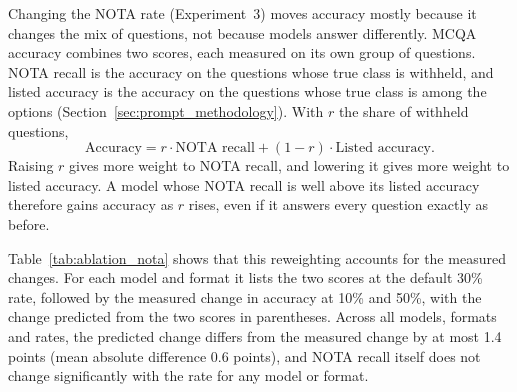 \documentclass[10pt,letterpaper]{article}
\newcommand{\tablefont}{\footnotesize}
\begin{document}
\begin{table}[!tp]
\centering
\caption{NOTA rate (Experiment 3; seed 0, seven models). MCQA accuracy combines NOTA recall, the accuracy on items whose true class is withheld, with listed accuracy, the accuracy on items whose true class is among the options (Section~\ref{sec:prompt_methodology}); both are measured at the default 30\% rate (\%). $\Delta$ at 10\% and $\Delta$ at 50\% give the measured change in accuracy (points) when 10\% or 50\% of items have their true class withheld, relative to the same model at 30\%. In parentheses is the change predicted, dataset by dataset, from NOTA recall and listed accuracy alone, i.e., if the model answered every item as before. $^{*}$95\% paired bootstrap CI over datasets excludes 0.}
\label{tab:ablation_nota}
\renewcommand{\arraystretch}{1.2}
\tablefont

\end{table}

Changing the NOTA rate (Experiment~3) moves accuracy mostly because it changes the mix of questions, not because models answer differently. MCQA accuracy combines two scores, each measured on its own group of questions. NOTA recall is the accuracy on the questions whose true class is withheld, and listed accuracy is the accuracy on the questions whose true class is among the options (Section~\ref{sec:prompt_methodology}). With $r$ the share of withheld questions,
\begin{equation}
  \text{Accuracy} = r \cdot \text{NOTA recall} + (1 - r) \cdot \text{Listed accuracy}.
\end{equation}
Raising $r$ gives more weight to NOTA recall, and lowering it gives more weight to listed accuracy. A model whose NOTA recall is well above its listed accuracy therefore gains accuracy as $r$ rises, even if it answers every question exactly as before.

Table~\ref{tab:ablation_nota} shows that this reweighting accounts for the measured changes. For each model and format it lists the two scores at the default 30\% rate, followed by the measured change in accuracy at 10\% and 50\%, with the change predicted from the two scores in parentheses. Across all models, formats and rates, the predicted change differs from the measured change by at most 1.4 points (mean absolute difference 0.6 points), and NOTA recall itself does not change significantly with the rate for any model or format.
\end{document}
